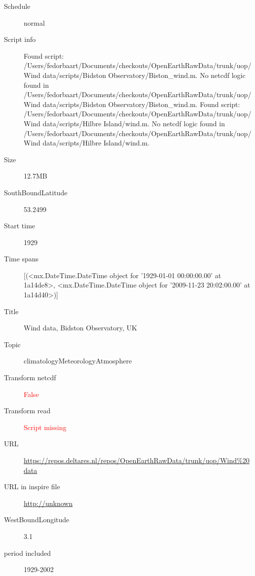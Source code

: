 \documentclass[9]{report}
\begin{document}
\begin{description}
\begin{verbatim}
\end{verbatim}
  \item[Schedule] normal
  \item[Script info] Found script: /Users/fedorbaart/Documents/checkouts/OpenEarthRawData/trunk/uop/Wind data/scripts/Bidston Observatory/Biston\_wind.m.
No netcdf logic found in /Users/fedorbaart/Documents/checkouts/OpenEarthRawData/trunk/uop/Wind data/scripts/Bidston Observatory/Biston\_wind.m.
Found script: /Users/fedorbaart/Documents/checkouts/OpenEarthRawData/trunk/uop/Wind data/scripts/Hilbre Island/wind.m.
No netcdf logic found in /Users/fedorbaart/Documents/checkouts/OpenEarthRawData/trunk/uop/Wind data/scripts/Hilbre Island/wind.m.
  \item[Size] 12.7MB
  \item[SouthBoundLatitude] 53.2499
  \item[Start time] 1929
  \item[Time spans] [(<mx.DateTime.DateTime object for '1929-01-01 00:00:00.00' at 1a14de8>, <mx.DateTime.DateTime object for '2009-11-23 20:02:00.00' at 1a14d40>)]
  \item[Title]  Wind data, Bidston Observatory, UK 
  \item[Topic] climatologyMeteorologyAtmosphere
  \item[Transform netcdf] \textcolor{red}{False}
  \item[Transform read] \textcolor{red}{Script missing}
  \item[URL] \href{https://repos.deltares.nl/repos/OpenEarthRawData/trunk/uop/Wind\%20data}{https://repos.deltares.nl/repos/OpenEarthRawData/trunk/uop/Wind\%20data}
  \item[URL in inspire file] \href{http://unknown}{http://unknown}
  \item[WestBoundLongitude] 3.1
  \item[period included] 1929-2002
\end{description}
\end{document}
